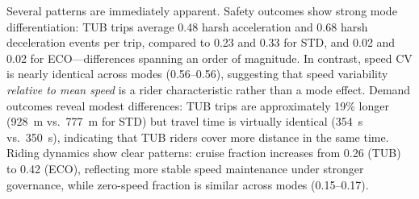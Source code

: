 Several patterns are immediately apparent. Safety outcomes show strong mode differentiation: TUB trips average 0.48 harsh acceleration and 0.68 harsh deceleration events per trip, compared to 0.23 and 0.33 for STD, and 0.02 and 0.02 for ECO---differences spanning an order of magnitude. In contrast, speed CV is nearly identical across modes (0.56--0.56), suggesting that speed variability \textit{relative to mean speed} is a rider characteristic rather than a mode effect. Demand outcomes reveal modest differences: TUB trips are approximately 19\% longer (928~m vs.~777~m for STD) but travel time is virtually identical (354~s vs.~350~s), indicating that TUB riders cover more distance in the same time. Riding dynamics show clear patterns: cruise fraction increases from 0.26 (TUB) to 0.42 (ECO), reflecting more stable speed maintenance under stronger governance, while zero-speed fraction is similar across modes (0.15--0.17).
